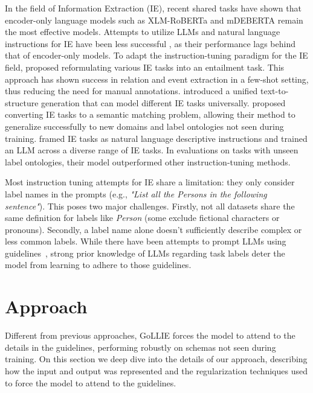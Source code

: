 \documentclass{article} \usepackage{iclr2024_conference,times}
\newcommand{\GoLLIE}{\scalerel*{\texttt{[image: logo/GoLLIE.pdf]}}{\textrm{\textbigcircle}} }
\begin{document}
In the field of Information Extraction (IE), recent shared tasks \citep{DBLP:conf/semeval/FetahuKCRM23} have shown that encoder-only language models such as XLM-RoBERTa \citep{DBLP:conf/acl/ConneauKGCWGGOZ20} and mDEBERTA \citep{DBLP:conf/iclr/HeGC23} remain the most effective models. Attempts to utilize LLMs and natural language instructions for IE have been less successful \citep{DBLP:conf/semeval/TanHJCL0ZTXH23,DBLP:journals/corr/abs-2308-03279,DBLP:journals/corr/abs-2305-12217}, as their performance lags behind that of encoder-only models. To adapt the instruction-tuning paradigm for the IE field, \cite{sainz-etal-2021-label, sainz-etal-2022-textual, sainz-etal-2022-zs4ie} proposed reformulating various IE tasks into an entailment task. This approach has shown success in relation and event extraction in a few-shot setting, thus reducing the need for manual annotations. \cite{DBLP:conf/acl/0001LDXLHSW22} introduced a unified text-to-structure generation that can model different IE tasks universally. \cite{DBLP:conf/aaai/Lou0DJLH0023} proposed converting IE tasks to a semantic matching problem, allowing their method to generalize successfully to new domains and label ontologies not seen during training. \cite{DBLP:journals/corr/abs-2304-08085} framed IE tasks as natural language descriptive instructions and trained an LLM across a diverse range of IE tasks. In evaluations on tasks with unseen label ontologies, their model outperformed other instruction-tuning methods. 

Most instruction tuning attempts for IE share a limitation: they only consider label names in the prompts (e.g., \textit{"List all the Persons in the following sentence"}). This poses two major challenges. Firstly, not all datasets share the same definition for labels like \textit{Person} (some exclude fictional characters or pronouns). Secondly, a label name alone doesn't sufficiently describe complex or less common labels. While there have been attempts to prompt LLMs using guidelines~\citep{DBLP:journals/corr/abs-2305-12217}, strong prior knowledge of LLMs regarding task labels \citep{DBLP:conf/acl/BlevinsGZ23} deter the model from learning to adhere to those guidelines. 


\section{Approach}

Different from previous approaches, \GoLLIE GoLLIE forces the model to attend to the details in the guidelines, performing robustly on schemas not seen during training. On this section we deep dive into the details of our approach, describing how the input and output was represented and the regularization techniques used to force the model to attend to the guidelines.
\end{document}
